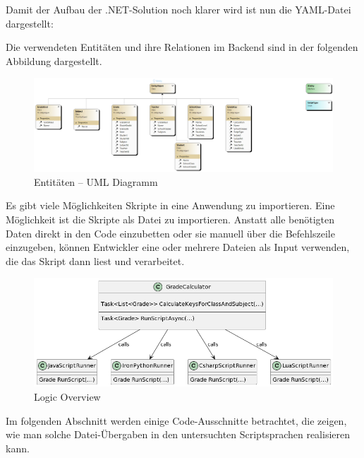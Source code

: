 \newpage
Damit der Aufbau der .NET-Solution noch klarer wird ist nun die YAML-Datei dargestellt:



\newpage

Die verwendeten Entitäten und ihre Relationen im Backend sind in der folgenden Abbildung dargestellt.

\begin{figure}[H]
    \centering
    \includegraphics[scale=0.5]{pics/EntitiesClassDiagram.png}
    \caption{Entitäten -- UML Diagramm}
    \label{fig:impl:Entities}
\end{figure}

\newpage
Es gibt viele Möglichkeiten Skripte in eine Anwendung zu importieren.
Eine Möglichkeit ist die Skripte als Datei zu importieren.
Anstatt alle benötigten Daten direkt in den Code einzubetten oder sie manuell über die Befehlszeile einzugeben, 
können Entwickler eine oder mehrere Dateien als Input verwenden, die das Skript dann liest und verarbeitet.

\begin{figure}[H]
    \centering
    \includegraphics[scale=0.5]{pics/LogicClassDiagram.png}
    \caption{Logic Overview}
    \label{fig:impl:Logic}
\end{figure}


\newpage
Im folgenden Abschnitt  werden einige Code-Ausschnitte betrachtet, die zeigen, wie man solche Datei-Übergaben in den untersuchten Scriptsprachen realisieren kann. 

